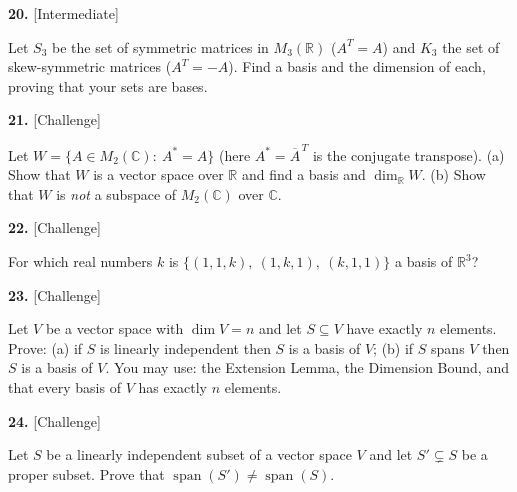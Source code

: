 \documentclass[11pt]{article}
\begin{document}
\begin{minipage}{\linewidth}\textbf{20.} \hfill{\scriptsize\color{ink}[Intermediate]}\par\nopagebreak Let $S_3$ be the set of symmetric matrices in $M_3(\mathbb{R})$ ($A^{T}=A$) and $K_3$ the set of skew-symmetric matrices ($A^{T}=-A$). Find a basis and the dimension of each, proving that your sets are bases.
\vspace{6.1cm}\end{minipage}\par\vspace{4pt}
\begin{minipage}{\linewidth}\textbf{21.} \hfill{\scriptsize\color{ink}[Challenge]}\par\nopagebreak Let $W=\{A\in M_2(\mathbb{C}):\ A^{*}=A\}$ (here $A^{*}=\overline{A}^{\,T}$ is the conjugate transpose). (a) Show that $W$ is a vector space over $\mathbb{R}$ and find a basis and $\dim_{\mathbb{R}}W$. (b) Show that $W$ is \emph{not} a subspace of $M_2(\mathbb{C})$ over $\mathbb{C}$.
\vspace{6.2cm}\end{minipage}\par\vspace{4pt}
\begin{minipage}{\linewidth}\textbf{22.} \hfill{\scriptsize\color{ink}[Challenge]}\par\nopagebreak For which real numbers $k$ is $\{(1,1,k),\ (1,k,1),\ (k,1,1)\}$ a basis of $\mathbb{R}^{3}$?
\vspace{5.4cm}\end{minipage}\par\vspace{4pt}
\begin{minipage}{\linewidth}\textbf{23.} \hfill{\scriptsize\color{ink}[Challenge]}\par\nopagebreak Let $V$ be a vector space with $\dim V=n$ and let $S\subseteq V$ have exactly $n$ elements. Prove: (a) if $S$ is linearly independent then $S$ is a basis of $V$; (b) if $S$ spans $V$ then $S$ is a basis of $V$. You may use: the Extension Lemma, the Dimension Bound, and that every basis of $V$ has exactly $n$ elements.
\vspace{6.6cm}\end{minipage}\par\vspace{4pt}
\begin{minipage}{\linewidth}\textbf{24.} \hfill{\scriptsize\color{ink}[Challenge]}\par\nopagebreak Let $S$ be a linearly independent subset of a vector space $V$ and let $S'\subsetneq S$ be a proper subset. Prove that $\operatorname{span}(S')\neq\operatorname{span}(S)$.
\vspace{4.4cm}\end{minipage}\par\vspace{4pt}
\end{document}
